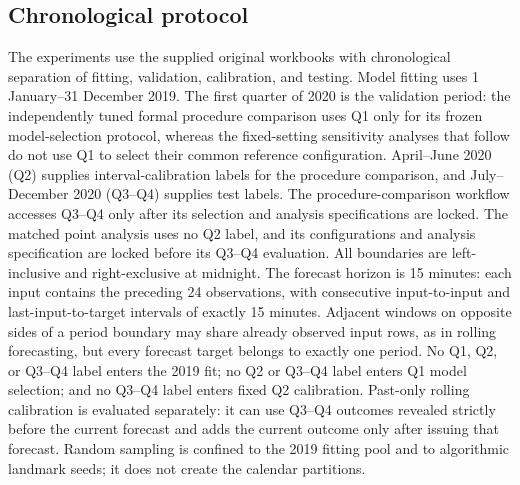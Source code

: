 \subsection{Chronological protocol}\label{sec:chronological}

{\color{blue}The experiments use the supplied original workbooks with chronological separation of fitting, validation, calibration, and testing. Model fitting uses 1 January--31 December 2019. The first quarter of 2020 is the validation period: the independently tuned formal procedure comparison uses Q1 only for its frozen model-selection protocol, whereas the fixed-setting sensitivity analyses that follow do not use Q1 to select their common reference configuration. April--June 2020 (Q2) supplies interval-calibration labels for the procedure comparison, and July--December 2020 (Q3--Q4) supplies test labels. The procedure-comparison workflow accesses Q3--Q4 only after its selection and analysis specifications are locked. The matched point analysis uses no Q2 label, and its configurations and analysis specification are locked before its Q3--Q4 evaluation. All boundaries are left-inclusive and right-exclusive at midnight. The forecast horizon is 15 minutes: each input contains the preceding 24 observations, with consecutive input-to-input and last-input-to-target intervals of exactly 15 minutes. Adjacent windows on opposite sides of a period boundary may share already observed input rows, as in rolling forecasting, but every forecast target belongs to exactly one period. No Q1, Q2, or Q3--Q4 label enters the 2019 fit; no Q2 or Q3--Q4 label enters Q1 model selection; and no Q3--Q4 label enters fixed Q2 calibration. Past-only rolling calibration is evaluated separately: it can use Q3--Q4 outcomes revealed strictly before the current forecast and adds the current outcome only after issuing that forecast. Random sampling is confined to the 2019 fitting pool and to algorithmic landmark seeds; it does not create the calendar partitions.}

